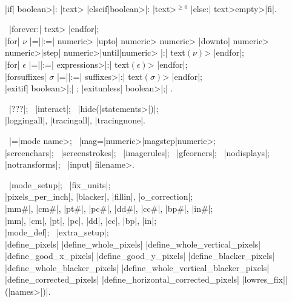 \medbreak\textindent{}\\
|if| \<boolean>|: |\<text> \bb|elseif|\<boolean>|: |\<text>\ee$^{\ge0}$%
\bb|else:| \<text>\cr\<empty>\ee|fi|.

\smallbreak\textindent{} \ |forever:| \<text> |endfor|;\\
|for| $\nu$ \bb|=|\cr|:=|\ee
\bb\<numeric> |upto| \<numeric>\cr
 \<numeric> |downto| \<numeric>\cr
 \<numeric>\thinspace|step|\thinspace
  \<numeric>\thinspace|until|\thinspace\<numeric>\ee
|:| \<text$(\nu)$> |endfor|;\\
|for| $\epsilon$ \bb|=|\cr|:=|\ee
 \<expressions>|:| \<text$(\epsilon)$> |endfor|;\\
|forsuffixes| $\sigma$ \bb|=|\cr|:=|\ee
 \<suffixes>|:| \<text$(\sigma)$> |endfor|;\\
|exitif| \<boolean>|;| ; \quad
|exitunless| \<boolean>|;| .

\medbreak\textindent{} \
|???|; \ |interact|; \
|hide(|\<statements>|)|;\\
|loggingall|, |tracingall|, |tracingnone|.

\textindent{} \
|\mode=|\<mode name>; \ |mag=|\bb\<numeric>\cr|magstep|\<numeric>\ee;\\
|screenchars|; \ |screenstrokes|; \ |imagerules|; \ |gfcorners|; \
|nodisplays|;\\
|notransforms|; \ |input| \<filename>.

\medbreak\textindent\bull {\it ^{Conversion to pixel units}:\/} \
|mode_setup|; \ |fix_units|;\\
|pixels_per_inch|, |blacker|, |fillin|, |o_correction|;\\
|mm#|, |cm#|, |pt#|, |pc#|, |dd#|, |cc#|, |bp#|, |in#|;\\
|mm|, |cm|, |pt|, |pc|, |dd|, |cc|, |bp|, |in|;\\
|mode_def|; \ |extra_setup|;\\
\bb|define_pixels|\cr
|define_whole_pixels|\cr
|define_whole_vertical_pixels|\cr
|define_good_x_pixels|\cr
|define_good_y_pixels|\cr
|define_blacker_pixels|\cr
|define_whole_blacker_pixels|\cr
|define_whole_vertical_blacker_pixels|\cr
|define_corrected_pixels|\cr
|define_horizontal_corrected_pixels|\cr
|lowres_fix|\ee|(|\<names>|)|.

